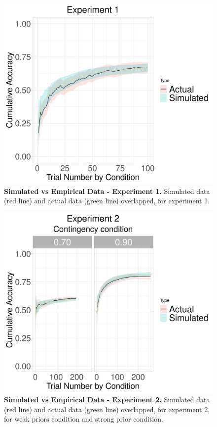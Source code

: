 \documentclass[a4paper,12pt]{article} 			%
\begin{document}
\begin{figure}[ht!]
\centerline
{\includegraphics[width=1\textwidth]{figures/SimulatedVsActual.exp=exp1.mod=fLR_Instr.png}}
\caption{\textbf{Simulated vs Empirical Data - Experiment 1.} Simulated data (red line) and actual data (green line) overlapped, for experiment 1.}
\label{fig:simvsemp_Exp1}
\end{figure}

\begin{figure}[ht!]
\centerline
{\includegraphics[width=1.5\textwidth]{figures/SimulatedVsActual.exp=exp2.mod=fLR_Instr.png}}
\caption{\textbf{Simulated vs Empirical Data - Experiment 2.} Simulated data (red line) and actual data (green line) overlapped, for experiment 2, for weak priors condition and strong prior condition. }
\label{fig:simvsemp_Exp12}
\end{figure}
\end{document}
